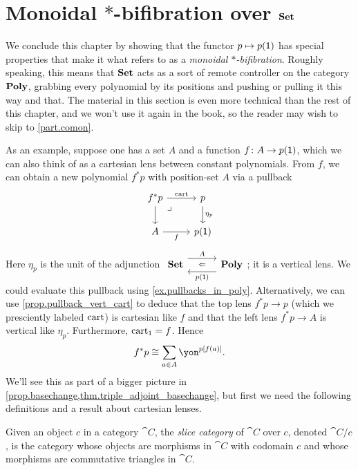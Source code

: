 \documentclass[Book-Poly]{subfiles}
\begin{document}
\section{Monoidal $*$-bifibration over $\mathbf{Set}$}

We conclude this chapter by showing that the functor $p\mapsto p(\textsf{1})$ has special properties that make it what \cite{shulman2008framed} refers to as a \emph{monoidal $*$-bifibration}.
Roughly speaking, this means that $\mathbf{Set}$ acts as a sort of remote controller on the category $\mathbf{Poly}$, grabbing every polynomial by its positions and pushing or pulling it this way and that.
The material in this section is even more technical than the rest of this chapter, and we won't use it again in the book, so the reader may wish to skip to \cref{part.comon}.

As an example, suppose one has a set $A$ and a function $f\colon A\to p(\textsf{1})$, which we can also think of as a cartesian lens between constant polynomials.
From $f$, we can obtain a new polynomial $f^*p$ with position-set $A$ via a pullback
\begin{equation}\label{eqn.f^*_defined}
\begin{tikzcd}
	f^*p\ar[r, "\fun{cart}"]\ar[d]&
	p\ar[d, "\eta_p"]\\
	A\ar[r, "f"']&
	p(\1)\ar[ul, phantom, very near end, "\lrcorner"]
\end{tikzcd}
\end{equation}
Here $\eta_p$ is the unit of the adjunction $\adjr{\smset}{A}{p(\1)}{\poly}$; it is a vertical lens.
We could evaluate this pullback using \cref{ex.pullbacks_in_poly}.
Alternatively, we can use \cref{prop.pullback_vert_cart} to deduce that the top lens $f^*p\to p$ (which we presciently labeled $\mathrm{cart}$) is cartesian like $f$ and that the left lens $f^*p\to A$ is vertical like $\eta_p$. Furthermore, $\mathrm{cart}_1 = f$.
Hence
\[
    f^*p \iso \sum_{a \in A} \yon^{p[f(a)]}.
\]
We'll see this as part of a bigger picture in \cref{prop.basechange,thm.triple_adjoint_basechange}, but first we need the following definitions and a result about cartesian lenses.

\begin{definition} \label{def.slice}
Given an object $c$ in a category $\cat{C}$, the \emph{slice category} of $\cat{C}$ over $c$, denoted $\cat{C}/c$, is the category whose objects are morphisms in $\cat{C}$ with codomain $c$ and whose morphisms are commutative triangles in $\cat{C}$.
\end{definition}
\end{document}
